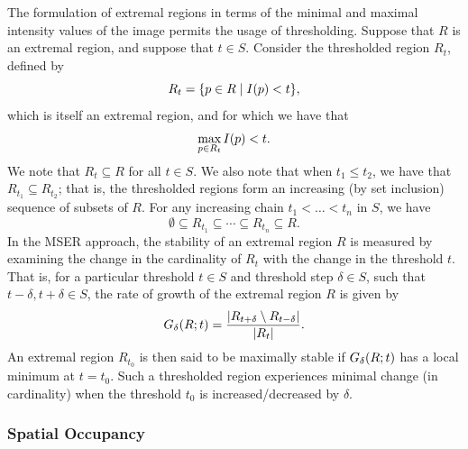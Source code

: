 \documentclass{article}
\begin{document}
The formulation of extremal regions in terms of the minimal and maximal
intensity values of the image permits the usage of thresholding.
Suppose that $R$ is an extremal region, and suppose that $t \in S$.
Consider the thresholded region $R_{t}$, defined by
\begin{equation}
  \label{eq:def-region-threshold}
  R_{t}
  =
  \lbrace
    p \in R
    \mid
    I(p) < t
  \rbrace
  ,
\end{equation}
which is itself an extremal region, and for which we have that
\begin{equation}
  \label{eq:def-region-threshold}
  \max_{p \in R_{t}} I(p)
  <
  t
  .
\end{equation}
We note that $R_{t} \subseteq R$ for all $t \in S$.
We also note that when $t_{1} \leq t_{2}$, we have that
$R_{t_{1}} \subseteq R_{t_{2}}$; that is, the thresholded regions form an
increasing (by set inclusion) sequence of subsets of $R$.
For any increasing chain $t_{1} < \dotsc < t_{n}$ in $S$, we have
\begin{equation}
  \label{eq:def-region-threshold-sequence}
  \emptyset
  \subseteq
  R_{t_{1}}
  \subseteq
  \dotsb
  \subseteq
  R_{t_{n}}
  \subseteq
  R
  .
\end{equation}
In the MSER approach, the stability of an extremal region $R$ is measured by
examining the change in the cardinality of $R_{t}$ with the change in the
threshold $t$.
That is, for a particular threshold $t \in S$ and threshold step $\delta \in S$,
such that $t - \delta, t + \delta \in S$, the rate of growth of the extremal
region $R$ is given by
\begin{equation}
  \label{eq:def-region-growth}
  G_{\delta}(R; t)
  =
  \frac
  {
    \lvert
      R_{t + \delta}
      \setminus
      R_{t - \delta}
    \rvert
  }
  {
    \lvert R_{t}\rvert
  }
  .
\end{equation}
An extremal region $R_{t_{0}}$ is then said to be maximally stable if
$G_{\delta}(R; t)$ has a local minimum at $t = t_{0}$.
Such a thresholded region experiences minimal change (in cardinality) when the
threshold $t_{0}$ is increased/decreased by $\delta$.

\subsubsection*{Spatial Occupancy}
\end{document}
